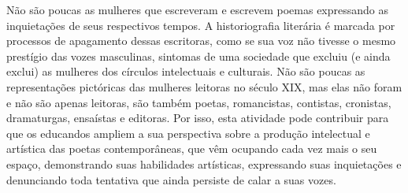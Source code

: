 \documentclass[12pt]{extarticle}
\begin{document}
Não são poucas as mulheres que escreveram e escrevem poemas expressando
as inquietações de seus respectivos tempos. A historiografia literária é
marcada por processos de apagamento dessas escritoras, como se sua voz
não tivesse o mesmo prestígio das vozes masculinas, sintomas de uma
sociedade que excluiu (e ainda exclui) as mulheres dos círculos
intelectuais e culturais. Não são poucas as representações pictóricas
das mulheres leitoras no século XIX, mas elas não foram e não são apenas
leitoras, são também poetas, romancistas, contistas, cronistas,
dramaturgas, ensaístas e editoras. Por isso, esta atividade pode
contribuir para que os educandos ampliem a sua perspectiva sobre a
produção intelectual e artística das poetas contemporâneas, que vêm
ocupando cada vez mais o seu espaço, demonstrando suas habilidades
artísticas, expressando suas inquietações e denunciando toda tentativa
que ainda persiste de calar a suas vozes.
\end{document}
